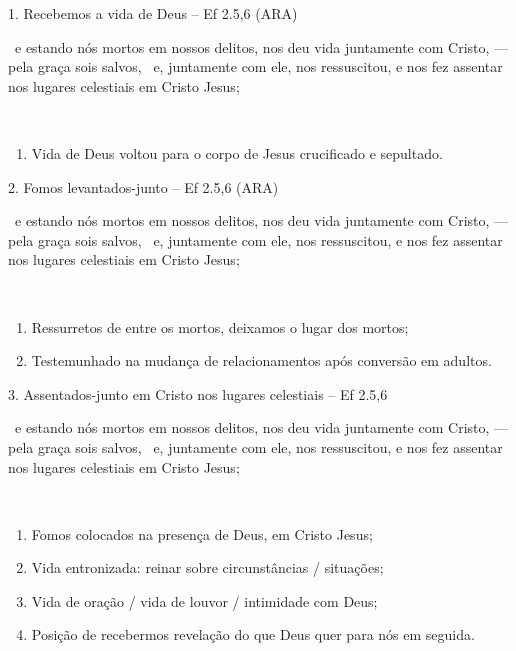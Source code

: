 \documentclass[12pt,aspectratio=169]{beamer}
\newcommand{\ver}[1]{%
    \raisebox{0.50ex}{%
        \scalebox{1.1}{%
            \pmb{\textbf{\textcolor{BSpbg}{#1}}}%
        }%
    }%
}
\newcommand{\QUOTE}[1]{%
    \par\noindent\hspace*{0.05\linewidth}%
    \begin{minipage}{0.9\linewidth}%
        \linespread{1.35}\large{#1}%
    \end{minipage}%
}
\newcommand{\YEL}[1]{{\textcolor{TXyel}{#1}}}
\newcommand{\CYA}[1]{{\textcolor{TXcya}{#1}}}
\newcommand{\MAG}[1]{{\textcolor{TXmag}{#1}}}
\newcommand{\BRI}[1]{{\textcolor{BSpbg}{#1}}}   %
\begin{document}
    \begin{frame}{1. \YEL{Recebemos a vida de Deus} -- Ef 2.5,6 (ARA)}
        \QUOTE{%
            \ver{5}~e estando nós mortos em nossos delitos, \YEL{nos deu vida juntamente}
            \MAG{com Cristo}, --- pela graça sois salvos,
            \ver{6}~e, \YEL{juntamente com ele, nos ressuscitou}, e \CYA{nos fez assentar nos
            lugares celestiais} \MAG{em Cristo Jesus};
        }
        \\[1.5\bigskipamount]
        \begin{enumerate}
            \item<2-> Vida de Deus voltou para o corpo de Jesus crucificado e sepultado.
        \end{enumerate}
    \end{frame}

    \begin{frame}{2. \YEL{Fomos levantados-junto} -- Ef 2.5,6 (ARA)}
        \QUOTE{%
            \ver{5}~e estando nós mortos em nossos delitos, \YEL{nos deu vida juntamente}
            \MAG{com Cristo}, --- pela graça sois salvos,
            \ver{6}~e, \YEL{juntamente com ele, nos ressuscitou}, e \CYA{nos fez assentar nos
            lugares celestiais} \MAG{em Cristo Jesus};
        }
        \\[1.5\bigskipamount]
        \begin{enumerate}
            \item<2-> Ressurretos de entre os mortos, deixamos o lugar dos mortos;
            \item<3-> Testemunhado na mudança de relacionamentos após conversão em adultos.
        \end{enumerate}
    \end{frame}

    \begin{frame}{3. \YEL{Assentados-junto em Cristo nos lugares celestiais} -- Ef 2.5,6}
        \QUOTE{%
            \ver{5}~e estando nós mortos em nossos delitos, \YEL{nos deu vida juntamente}
            \MAG{com Cristo}, --- pela graça sois salvos,
            \ver{6}~e, \YEL{juntamente com ele, nos ressuscitou}, e \CYA{nos fez assentar nos
            lugares celestiais} \MAG{em Cristo Jesus};
        }
        \\[1.5\bigskipamount]
        \begin{enumerate}
            \item<2-> Fomos \BRI{colocados na presença de Deus, em Cristo Jesus};
            \item<3-> Vida entronizada: reinar sobre \BRI{circunstâncias} / \BRI{situações};
            \item<4-> Vida de \BRI{oração} / vida de \BRI{louvor} / \BRI{intimidade} com Deus;
            \item<5-> \BRI{Posição} de recebermos revelação do que Deus quer para nós \BRI{em
                seguida}.
        \end{enumerate}
    \end{frame}
\end{document}
